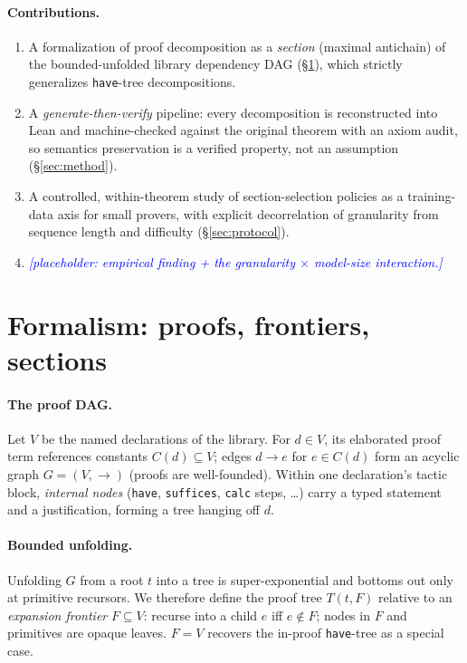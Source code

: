 \documentclass[11pt]{article}
\newcommand{\PLACEHOLDER}[1]{\textcolor{blue}{\emph{[placeholder: #1]}}}
\begin{document}
\paragraph{Contributions.}
\begin{enumerate}
  \item A formalization of proof decomposition as a \emph{section} (maximal
        antichain) of the bounded-unfolded library dependency DAG
        (\S\ref{sec:formalism}), which strictly generalizes
        \texttt{have}-tree decompositions.
  \item A \emph{generate-then-verify} pipeline: every decomposition is
        reconstructed into Lean and machine-checked against the original
        theorem with an axiom audit, so semantics preservation is a verified
        property, not an assumption (\S\ref{sec:method}).
  \item A controlled, within-theorem study of section-selection policies as a
        training-data axis for small provers, with explicit decorrelation of
        granularity from sequence length and difficulty
        (\S\ref{sec:protocol}).
  \item \PLACEHOLDER{empirical finding + the granularity $\times$ model-size
        interaction.}
\end{enumerate}

\section{Formalism: proofs, frontiers, sections}
\label{sec:formalism}

\paragraph{The proof DAG.} Let $V$ be the named declarations of the library.
For $d\in V$, its elaborated proof term references constants $C(d)\subseteq V$;
edges $d\to e$ for $e\in C(d)$ form an acyclic graph $G=(V,\to)$ (proofs are
well-founded). Within one declaration's tactic block, \emph{internal nodes}
(\texttt{have}, \texttt{suffices}, \texttt{calc} steps, \dots) carry a
typed statement and a justification, forming a tree hanging off $d$.

\paragraph{Bounded unfolding.} Unfolding $G$ from a root $t$ into a tree is
super-exponential and bottoms out only at primitive recursors. We therefore
define the proof tree $T(t,F)$ relative to an \emph{expansion frontier}
$F\subseteq V$: recurse into a child $e$ iff $e\notin F$; nodes in $F$ and
primitives are opaque leaves. $F=V$ recovers the in-proof \texttt{have}-tree
as a special case.
\end{document}
